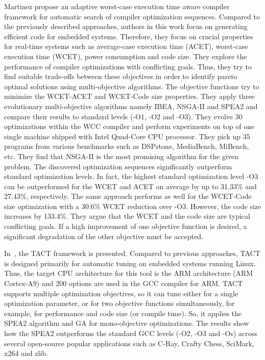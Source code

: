 Martinez \etal\cite{martinez2014multi} propose an adaptive worst-case execution time aware compiler framework for automatic search of compiler optimization sequences. 
Compared to the previously described approaches, authors in this work focus on generating efficient code for embedded systems. Therefore, they focus on crucial properties for real-time systems such as average-case execution time (ACET), worst-case execution time (WCET), power consumption and code size. 
They explore the performance of compiler optimizations with conflicting goals. Thus, they try to find suitable trade-offs between these objectives in order to identify pareto optimal solutions using multi-objective algorithms. The objective functions try to minimize the WCET-ACET and WCET-Code size properties. They apply three evolutionary multi-objective algorithms namely IBEA, NSGA-II and SPEA2 and compare their results to standard levels (-O1, -O2 and -O3). 
They evolve 30 optimizations within the WCC compiler and perform experiments on top of one single machine shipped with Intel Quad-Core CPU processor. They pick up 35  programs from various benchmarks such as DSPstone, MediaBench, MiBench, etc.
They find that NSGA-II is the most promising algorithm for the given problem. The discovered optimization sequences significantly outperform standard optimization levels. In fact, the highest standard optimization level -O3 can be outperformed for the WCET and ACET on average by up to 31.33\% and 27.43\%, respectively. The same approach performs as well for the WCET-Code size optimization with a 30.6\% WCET reduction over -O3. However, the code size increases by 133.4\%. They argue that the WCET and the code size are typical conflicting goals. If a high improvement of one objective function is desired, a significant degradation of the other objective must be accepted.

In~\cite{plotnikov2013automatic}, the TACT framework is presented. 
Compared to previous approaches, TACT is designed primarily for automatic tuning on embedded systems running Linux. Thus, the target CPU architecture for this tool is the ARM architecture (ARM Cortex-A9) and 200 options are used in the GCC compiler for ARM. 
TACT supports multiple optimization objectives, so it can tune either for a single optimization parameter, or for two objective functions simultaneously, for example, for performance and code size (or compile time). So, it applies the SPEA2 algorithm and GA for mono-objective optimizations.
The results show how the SPEA2 outperforms the standard GCC levels (-O2, -O3 and -Os) across several open-source popular applications such as  C-Ray, Crafty Chess, SciMark, x264 and zlib.



